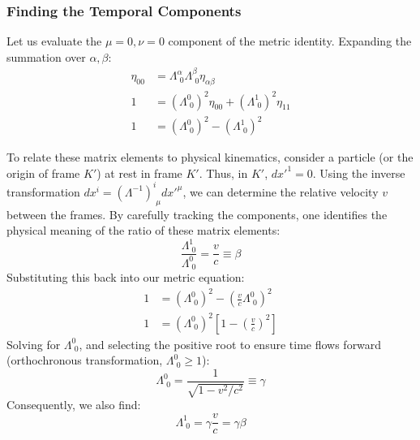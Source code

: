 \subsubsection*{Finding the Temporal Components}
Let us evaluate the $\mu=0, \nu=0$ component of the metric identity. Expanding the summation over $\alpha, \beta$:
\begin{align}
    \eta_{00} &= \Lambda^\alpha_{\,\,0} \Lambda^\beta_{\,\,0} \eta_{\alpha\beta} \\
    1 &= (\Lambda^0_{\,\,0})^2 \eta_{00} + (\Lambda^1_{\,\,0})^2 \eta_{11} \\
    1 &= (\Lambda^0_{\,\,0})^2 - (\Lambda^1_{\,\,0})^2
    \label{eq:lec04:00-component}
\end{align}

To relate these matrix elements to physical kinematics, consider a particle (or the origin of frame $K'$) at rest in frame $K'$. Thus, in $K'$, $dx'^1 = 0$. Using the inverse transformation $dx^i = (\Lambda^{-1})^i_{\,\,\mu} dx'^\mu$, we can determine the relative velocity $v$ between the frames. By carefully tracking the components, one identifies the physical meaning of the ratio of these matrix elements:
\begin{equation}\label{eq:lec04:beta-ratio}
    \frac{\Lambda^1_{\,\,0}}{\Lambda^0_{\,\,0}} = \frac{v}{c} \equiv \beta
\end{equation}
Substituting this back into our metric equation:
\begin{align}
    1 &= (\Lambda^0_{\,\,0})^2 - \left(\frac{v}{c} \Lambda^0_{\,\,0}\right)^2 \\
    1 &= (\Lambda^0_{\,\,0})^2 \left[1 - \left(\frac{v}{c}\right)^2\right]
    \label{eq:lec04:gamma-derivation}
\end{align}
Solving for $\Lambda^0_{\,\,0}$, and selecting the positive root to ensure time flows forward (orthochronous transformation, $\Lambda^0_{\,\,0} \geq 1$):
\begin{equation}\label{eq:lec04:lambda00}
    \Lambda^0_{\,\,0} = \frac{1}{\sqrt{1 - v^2/c^2}} \equiv \gamma
\end{equation}
Consequently, we also find:
\begin{equation}\label{eq:lec04:lambda10}
    \Lambda^1_{\,\,0} = \gamma \frac{v}{c} = \gamma \beta
\end{equation}

